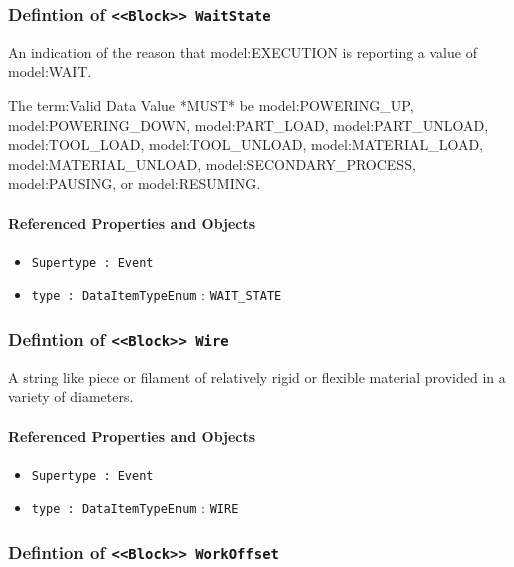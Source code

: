 \subsubsection{Defintion of \texttt{<<Block>> WaitState}}
  \label{type:WaitState}

\FloatBarrier

An indication of the reason that {model:EXECUTION} is reporting a value of {model:WAIT}.
  
 The {term:Valid Data Value} *MUST* be {model:POWERING_UP}, {model:POWERING_DOWN}, {model:PART_LOAD}, {model:PART_UNLOAD}, {model:TOOL_LOAD}, {model:TOOL_UNLOAD}, {model:MATERIAL_LOAD}, {model:MATERIAL_UNLOAD}, {model:SECONDARY_PROCESS}, {model:PAUSING}, or {model:RESUMING}.

\FloatBarrier
\paragraph{Referenced Properties and Objects}

\begin{itemize}
\item \texttt{Supertype : Event}

\item \texttt{type : DataItemTypeEnum} : \texttt{WAIT_STATE}

\end{itemize}
\FloatBarrier
\subsubsection{Defintion of \texttt{<<Block>> Wire}}
  \label{type:Wire}

\FloatBarrier

A string like piece or filament of relatively rigid or flexible material provided in a variety of diameters.

\FloatBarrier
\paragraph{Referenced Properties and Objects}

\begin{itemize}
\item \texttt{Supertype : Event}

\item \texttt{type : DataItemTypeEnum} : \texttt{WIRE}

\end{itemize}
\FloatBarrier
\subsubsection{Defintion of \texttt{<<Block>> WorkOffset}}
  \label{type:WorkOffset}

